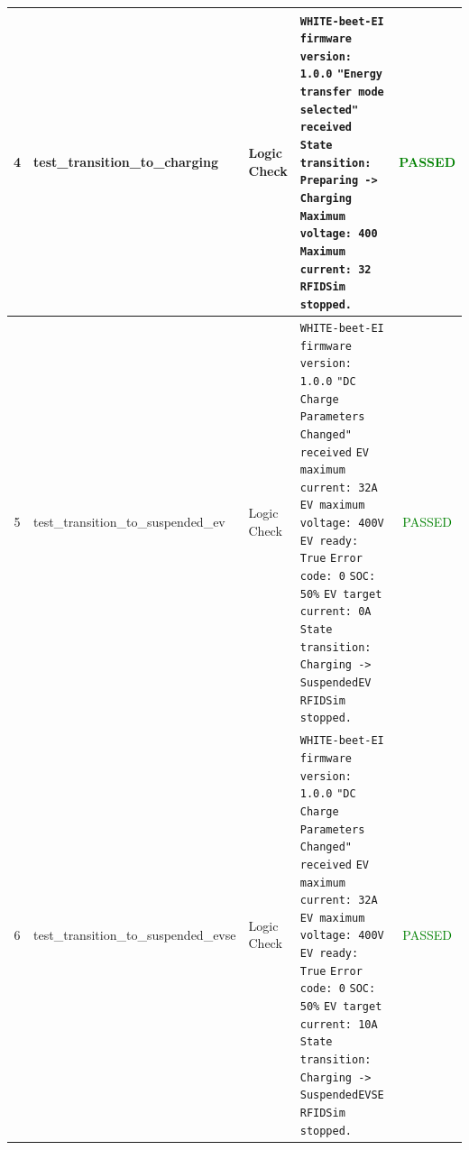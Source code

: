 \documentclass[10pt, a4paper, landscape]{article}
\begin{document}
\begin{longtable}{|c|p{6cm}|p{2.5cm}|p{8cm}|c|}
\hline
4 & test\_transition\_to\_charging & Logic Check & \texttt{\scriptsize WHITE-beet-EI firmware version: 1.0.0} \newline \texttt{\scriptsize "Energy transfer mode selected" received} \newline \texttt{\scriptsize State transition: Preparing -> Charging} \newline \texttt{\scriptsize Maximum voltage: 400} \newline \texttt{\scriptsize Maximum current: 32} \newline \texttt{\scriptsize RFIDSim stopped.} & \textcolor{green}{PASSED} \\
\hline
5 & test\_transition\_to\_suspended\_ev & Logic Check & \texttt{\scriptsize WHITE-beet-EI firmware version: 1.0.0} \newline \texttt{\scriptsize "DC Charge Parameters Changed" received} \newline \texttt{\scriptsize EV maximum current: 32A} \newline \texttt{\scriptsize EV maximum voltage: 400V} \newline \texttt{\scriptsize EV ready: True} \newline \texttt{\scriptsize Error code: 0} \newline \texttt{\scriptsize SOC: 50\%} \newline \texttt{\scriptsize EV target current: 0A} \newline \texttt{\scriptsize State transition: Charging -> SuspendedEV} \newline \texttt{\scriptsize RFIDSim stopped.} & \textcolor{green}{PASSED} \\
\hline
6 & test\_transition\_to\_suspended\_evse & Logic Check & \texttt{\scriptsize WHITE-beet-EI firmware version: 1.0.0} \newline \texttt{\scriptsize "DC Charge Parameters Changed" received} \newline \texttt{\scriptsize EV maximum current: 32A} \newline \texttt{\scriptsize EV maximum voltage: 400V} \newline \texttt{\scriptsize EV ready: True} \newline \texttt{\scriptsize Error code: 0} \newline \texttt{\scriptsize SOC: 50\%} \newline \texttt{\scriptsize EV target current: 10A} \newline \texttt{\scriptsize State transition: Charging -> SuspendedEVSE} \newline \texttt{\scriptsize RFIDSim stopped.} & \textcolor{green}{PASSED} \\

\end{longtable}
\end{document}
